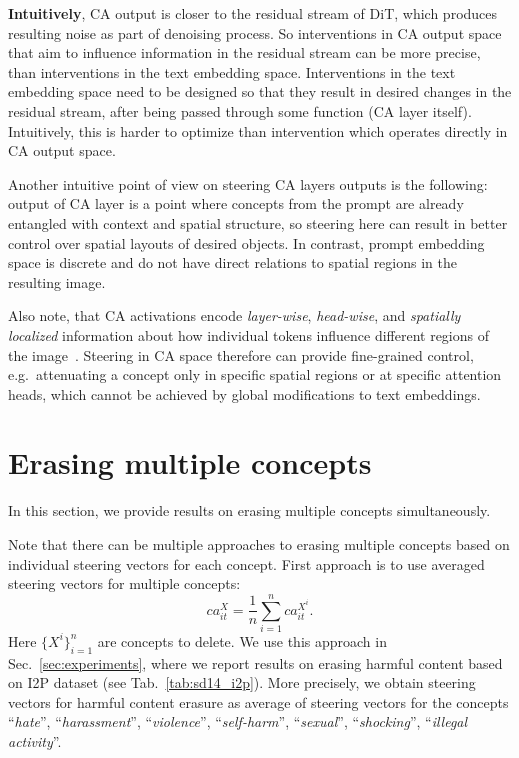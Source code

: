 \textbf{Intuitively}, CA output is closer to the residual stream of DiT, which produces resulting noise as part of denoising process. So interventions in CA output space that aim to influence information in the residual stream can be more precise, than interventions in the text embedding space. Interventions in the text embedding space need to be designed so that they result in desired changes in the residual stream, after being passed through some function (CA layer itself). Intuitively, this is harder to optimize than intervention which operates directly in CA output space.

Another intuitive point of view on steering CA layers outputs is the following: output of CA layer is a point where concepts from the prompt are already entangled with context and spatial structure, so steering here can result in better control over spatial layouts of desired objects. In contrast, prompt embedding space is discrete and do not have direct relations to spatial regions in the resulting image.

Also note, that CA activations encode \emph{layer-wise}, \emph{head-wise}, and \emph{spatially localized} information about how individual tokens influence different regions of the image~\cite{DBLP:conf/iclr/HertzMTAPC23}. Steering in CA space therefore can provide fine-grained control, e.g.\ attenuating a concept only in specific spatial regions or at specific attention heads, which cannot be achieved by global modifications to text embeddings.

\clearpage
\section{Erasing multiple concepts}
\label{sec:erasing_multiple_concepts}

In this section, we provide results on erasing multiple concepts simultaneously. 

Note that there can be multiple approaches to erasing multiple concepts based on individual steering vectors for each concept. First approach is to use averaged steering vectors for multiple concepts:
\begin{equation}
ca^{X}_{it} = \frac{1}{n}\sum_{i=1}^n ca^{X^{i}}_{it}.
\end{equation} 
Here $\{X^i\}_{i=1}^n$ are concepts to delete. We use this approach in Sec.~\ref{sec:experiments}, where we report results on erasing harmful content based on I2P dataset (see Tab.~\ref{tab:sd14_i2p}). More precisely, we obtain steering vectors for harmful content erasure as average of steering vectors for the concepts ``\textit{hate}'', ``\textit{harassment}'', ``\textit{violence}'', ``\textit{self-harm}'', ``\textit{sexual}'', ``\textit{shocking}'', ``\textit{illegal activity}''. 

